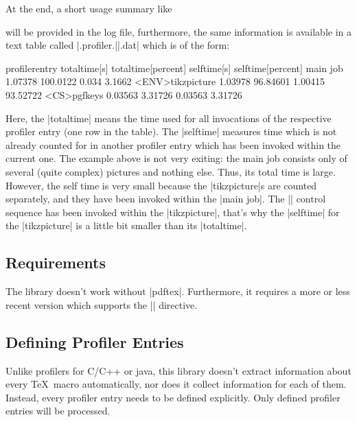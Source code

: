 At the end, a short usage summary like
\noindent will be provided in the log file, furthermore, the same information is available in a text table called |\jobname.profiler.||.dat| which is of the form:
\begin{codeexample}
profilerentry       totaltime[s]        totaltime[percent]  selftime[s]         selftime[percent]
main job            1.07378             100.0122            0.034               3.1662
<ENV>tikzpicture    1.03978             96.84601            1.00415             93.52722
<CS>pgfkeys         0.03563             3.31726             0.03563             3.31726
\end{codeexample}
Here, the |totaltime| means the time used for all invocations of the respective profiler entry (one row in the table). The |selftime| measures time which is not already counted for in another profiler entry which has been invoked within the current one. The example above is not very exiting: the main job consists only of several (quite complex) pictures and nothing else. Thus, its total time is large. However, the self time is very small because the |tikzpicture|s are counted separately, and they have been invoked within the |main job|. The |\pgfkeys| control sequence has been invoked within the |tikzpicture|, that's why the |selftime| for the |tikzpicture| is a little bit smaller than its |totaltime|.

\subsection{Requirements}
The library doesn't work without |pdftex|. Furthermore, it requires a more or less recent version which supports the |\pdfelapsedtime| directive.

\subsection{Defining Profiler Entries}
Unlike profilers for C/C++ or java, this library doesn't extract information about every \TeX\ macro automatically, nor does it collect information for each of them. Instead, every profiler entry needs to be defined explicitly. Only defined profiler entries will be processed.

